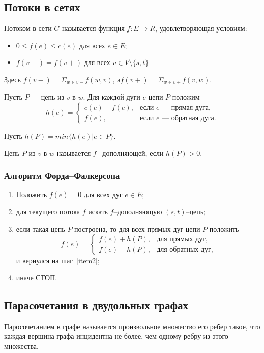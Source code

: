 \subsection{Потоки в сетях}

Потоком в сети $G$ называется функция $f : E \rightarrow R$, удовлетворяющая условиям:
\begin{itemize}
	\item $0 \le f (e) \le c(e)$ для всех $e \in E$;
	\item $f (v −) = f (v +)$ для всех $v \in V \setminus \{s , t \}$
\end{itemize}
Здесь $f(v−)=\Sigma_{w \in v−}   f(w,v)$, а$f(v+)=\Sigma_{w \in v+}   f(v,w)$.


Пусть $P$ — цепь из $v$ в $w$. Для каждой дуги $e$ цепи $P$ положим
\begin{equation}
h(e)=\begin{cases}
                c(e)-f(e), &\text{если $e$~--- прямая дуга,}\\
                f(e), &\text{если  $e$~--- обратная дуга.}
         \end{cases}
\end{equation}

Пусть $h(P) = min\{h(e)|e \in  P\}$.

Цепь $P$ из $v$ в $w$ называется $f$ –дополняющей, если $h(P) > 0$.

\subsubsection{Алгоритм Форда–Фалкерсона}

\begin{enumerate}
\item Положить $f(e) = 0$ для всех дуг $e\in E$;
\item для текущего потока $f$ искать $f$--дополняющую $(s,t)$--цепь;\label{item2}
\item если такая цепь $P$ построена, то для всех прямых дуг цепи $P$ положить
$$
  f(e)=\begin{cases}
                f(e)+h(P), &\text{для прямых дуг},\\
                f(e)-h(P), &\text{для обратных дуг},
          \end{cases}
$$
и вернулся на шаг~\ref{item2};
\item иначе СТОП.
\end{enumerate}


\subsection{Парасочетания в двудольных графах}
Паросочетанием в графе называется произвольное множество его ребер такое, что каждая вершина графа инцидентна не более, чем одному ребру из этого множества.

